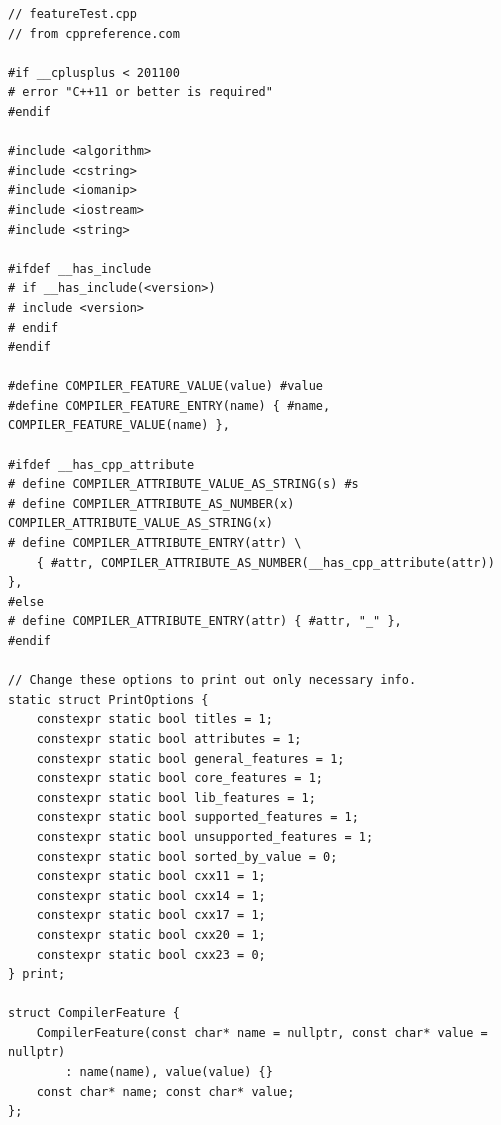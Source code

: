 \begin{lstlisting}[style=styleCXX]
// featureTest.cpp
// from cppreference.com

#if __cplusplus < 201100
# error "C++11 or better is required"
#endif

#include <algorithm>
#include <cstring>
#include <iomanip>
#include <iostream>
#include <string>

#ifdef __has_include
# if __has_include(<version>)
# include <version>
# endif
#endif

#define COMPILER_FEATURE_VALUE(value) #value
#define COMPILER_FEATURE_ENTRY(name) { #name, COMPILER_FEATURE_VALUE(name) },

#ifdef __has_cpp_attribute
# define COMPILER_ATTRIBUTE_VALUE_AS_STRING(s) #s
# define COMPILER_ATTRIBUTE_AS_NUMBER(x) COMPILER_ATTRIBUTE_VALUE_AS_STRING(x)
# define COMPILER_ATTRIBUTE_ENTRY(attr) \
	{ #attr, COMPILER_ATTRIBUTE_AS_NUMBER(__has_cpp_attribute(attr)) },
#else
# define COMPILER_ATTRIBUTE_ENTRY(attr) { #attr, "_" },
#endif

// Change these options to print out only necessary info.
static struct PrintOptions {
	constexpr static bool titles = 1;
	constexpr static bool attributes = 1;
	constexpr static bool general_features = 1;
	constexpr static bool core_features = 1;
	constexpr static bool lib_features = 1;
	constexpr static bool supported_features = 1;
	constexpr static bool unsupported_features = 1;
	constexpr static bool sorted_by_value = 0;
	constexpr static bool cxx11 = 1;
	constexpr static bool cxx14 = 1;
	constexpr static bool cxx17 = 1;
	constexpr static bool cxx20 = 1;
	constexpr static bool cxx23 = 0;
} print;

struct CompilerFeature {
	CompilerFeature(const char* name = nullptr, const char* value = nullptr)
		: name(name), value(value) {}
	const char* name; const char* value;
};


\end{lstlisting}
